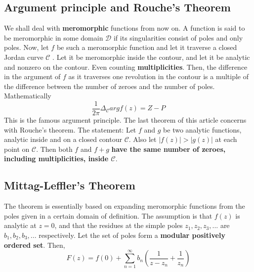 \documentclass[11pt]{article}
\begin{document}
\begin{sloppypar}
\subsection{Argument principle and Rouche\rq{}s Theorem}
We shall deal with \textbf{meromorphic} functions from now on. A function is said to be meromorphic in some domain $\mathcal{D}$ if its singularities consist of poles and only poles. Now, let $f$ be such a meromorphic function and let it traverse a closed Jordan curve $\mathcal{C}$ .  Let it be meromorphic inside the contour, and let it be analytic and nonzero on the contour. Even counting \textbf{multiplicities}. Then, the difference in the argument of $f$ as it traverses one revolution in the contour is a multiple of the difference between the number of zeroes and the number of poles. Mathematically
$$\frac{1}{2\pi}\Delta_{\mathcal{C}} arg f(z) = Z-P$$
This is the famous argument principle. The last theorem of this article concerns with Rouche\rq{}s theorem. The statement: Let $f$ and $g$ be two analytic functions, analytic inside and on a closed contour $\mathcal{C}$. Also let $|f(z)|>|g(z)|$ at each point on $\mathcal{C}$. Then both $f$ and $f+g$\textbf{ have the same number of zeroes, including multiplicities, inside $\mathcal{C}$}.

\subsection{Mittag-Leffler's Theorem}
The theorem is essentially based on expanding meromorphic functions from the poles given in a certain domain of definition. The assumption is that $f(z)$ is analytic at $z=0$, and that the residues at the simple poles $z_1,z_2,z_3,...$ are $b_1,b_2,b_3,...$ respectively. Let the set of poles form a \textbf{modular positively ordered set}. Then,
$$F(z) = f(0) + \sum_{n=1}^\infty b_n(\frac{1}{z-z_n}+\frac{1}{z_n})$$


\end{sloppypar}
\end{document}
